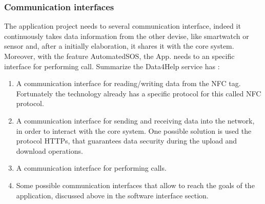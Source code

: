 \subsubsection{Communication interfaces} 
The application project needs to several communication interface, indeed it continuously takes data information from the other devise, like smartwatch or sensor and, after a initially elaboration, it shares it with the core system. Moreover, with the feature AutomatedSOS, the App. needs to an specific interface for performing call. Summarize the Data4Help service has :
\begin{enumerate}
\item A communication interface for reading/writing data from the NFC tag. Fortunately the technology already has a specific protocol for this called NFC protocol.
\item A communication interface for sending and receiving data into the network, in order to interact with the core system. One possible solution is used the protocol HTTPs, that guarantees data security during the upload and download operations. 
\item A communication interface for performing calls. 
\item Some possible communication interfaces that allow to reach the goals of the application, discussed above in the software interface section.
\end{enumerate} 
